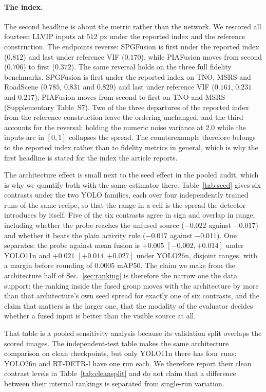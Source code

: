 \documentclass[journal]{IEEEtran}
\begin{document}
\begin{sloppypar}
\paragraph{The index.} The second headline is about the metric rather than the network.
We rescored all fourteen LLVIP inputs at $512$ px under the reported index and the
reference construction. The endpoints reverse: SPGFusion is first under the reported
index ($0.812$) and last under reference VIF ($0.170$), while PIAFusion moves from second
($0.706$) to first ($0.372$). The same reversal holds on the three full fidelity
benchmarks. SPGFusion is first under the reported index on TNO, MSRS and RoadScene
($0.785$, $0.831$ and $0.829$) and last under reference VIF
($0.161$, $0.231$ and $0.217$); PIAFusion moves from second to first on TNO and MSRS
(Supplementary Table~S7).
Two of the three departures of the reported index from the reference construction leave
the ordering unchanged, and the third accounts for the reversal: holding the numeric
noise variance at $2.0$ while the inputs are in $[0,1]$ collapses the spread. The
counterexample therefore belongs to the reported index rather than to fidelity metrics in
general, which is why the first headline is stated for the index the article reports.

The architecture effect is small next to the seed effect in the pooled audit, which is
why we quantify both with the same estimator there. Table~\ref{tab:seed} gives six
contrasts under the two YOLO
families, each over four independently trained runs of the same recipe, so that the
range in a cell is the spread the detector introduces by itself. Five of the six
contrasts agree in sign and overlap in range, including whether the probe reaches the
unfused source ($-0.022$ against $-0.017$) and whether it beats the plain activity rule
($-0.017$ against $-0.011$). One separates: the probe against mean fusion is $+0.005$
$[-0.002,+0.014]$ under YOLO11n and $+0.021$ $[+0.014,+0.027]$ under YOLO26n, disjoint
ranges, with a margin before rounding of $0.0005$ mAP50. The claim we make from the
architecture half of Sec.~\ref{sec:ranking} is therefore the narrow one the data
support: the ranking inside the fused group moves with the architecture by more than
that architecture's own seed spread for exactly one of six contrasts, and the claim
that matters is the larger one, that the modality of the evaluator decides whether a
fused input is better than the visible source at all.

That table is a pooled sensitivity analysis because its validation split overlaps the
scored images. The independent-test table makes the same architecture comparison on
clean checkpoints, but only YOLO11n there has four runs; YOLO26n and RT-DETR-l have one
run each. We therefore report their clean contrast levels in
Table~\ref{tab:cleansplit} and do not claim that a difference between their internal
rankings is separated from single-run variation.


\end{sloppypar}
\end{document}
